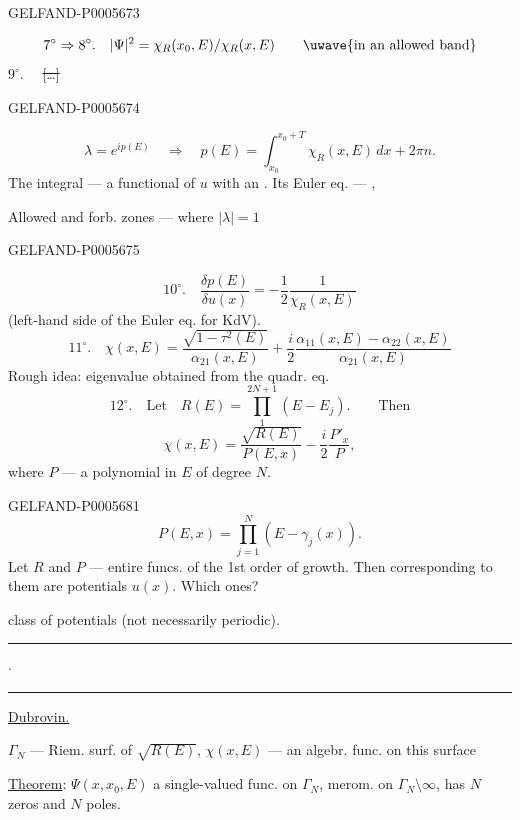 \begin{GelfandAdjacentEvidence}{GELFAND-P000567}{3}

\[
7^\circ\Rightarrow8^\circ.\quad|\Psi|^2=\chi_R(x_0,E)/\chi_R(x,E)
\qquad\text{\uwave{in an allowed band}}
\]
\(9^\circ.\quad\) \sout{[…]}
\end{GelfandAdjacentEvidence}
\begin{GelfandAdjacentEvidence}{GELFAND-P000567}{4}

\[
\lambda=e^{ip(E)}\quad\Rightarrow\quad
p(E)=\int_{x_0}^{x_0+T}\chi_R(x,E)\,dx+2\pi n.
\]
The integral — a functional of \(u\) with an . Its Euler eq. — ,

Allowed and forb. zones — where \(|\lambda|=1\)
\end{GelfandAdjacentEvidence}
\begin{GelfandAdjacentEvidence}{GELFAND-P000567}{5}

\[
10^\circ.\quad\frac{\delta p(E)}{\delta u(x)}=-\frac12\frac1{\chi_R(x,E)}
\]
(left-hand side of the Euler eq. for KdV).
\[
11^\circ.\quad\chi(x,E)=
\frac{\sqrt{1-\tau^2(E)}}{\alpha_{21}(x,E)}+
\frac i2\frac{\alpha_{11}(x,E)-\alpha_{22}(x,E)}{\alpha_{21}(x,E)}
\]
Rough idea: eigenvalue obtained from the quadr. eq.
\[
12^\circ.\quad\text{Let}\quad R(E)=\prod_1^{2N+1}(E-E_j).
\qquad\text{Then}
\]
\[
\chi(x,E)=\frac{\sqrt{R(E)}}{P(E,x)}-\frac i2\frac{P'_x}{P},
\]
where \(P\) — a polynomial in \(E\) of degree \(N\).
\end{GelfandAdjacentEvidence}



\begin{GelfandAdjacentEvidence}{GELFAND-P000568}{1}
\[
P(E,x)=\prod_{j=1}^{N}(E-\gamma_j(x)).
\]
 Let \(R\) and \(P\) — entire funcs. of the 1st order of growth. Then corresponding to them are potentials \(u(x)\). Which ones?

class of potentials (not necessarily periodic).
\noindent\hfill\rule{1.1cm}{.32pt}\enspace\(\cdot\)\enspace\rule{.9cm}{.32pt}\par
\underline{Dubrovin.}

\(\Gamma_N\) — Riem. surf. of \(\sqrt{R(E)}\), \(\chi(x,E)\) — an algebr. func. on this surface

\underline{Theorem}: \(\Psi(x,x_0,E)\) a single-valued func. on \(\Gamma_N\),
merom. on \(\Gamma_N\setminus\infty\), has \(N\) zeros and \(N\) poles.
\end{GelfandAdjacentEvidence}

